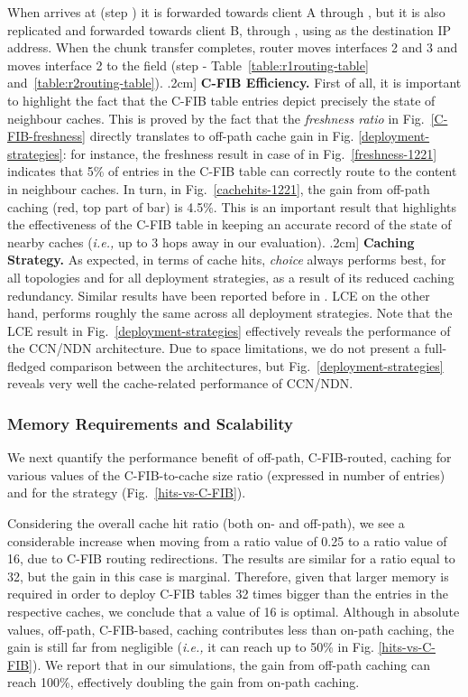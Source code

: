\documentclass{sig-alternate}
\newcommand{\ie}{{\em i.e.,\/ }}
\begin{document}
 
When  arrives at  (step ) it is forwarded towards client A through , but it is also replicated and forwarded towards client B, through , using  as the destination IP address. When the chunk  transfer completes, router  moves interfaces 2 and 3 and  moves interface 2 to the  field (step  - Table~\ref{table:r1routing-table} and~\ref{table:r2routing-table}).
\0.2cm]
\textbf{C-FIB Efficiency.} First of all, it is important to highlight the fact that the C-FIB table entries depict precisely the state of neighbour caches. This is proved by the fact that the \textit{freshness ratio} in Fig.~\ref{C-FIB-freshness} directly translates to off-path cache gain in Fig. \ref{deployment-strategies}: for instance, the freshness result in case of  in Fig.~\ref{freshness-1221} indicates that 5\% of entries in the C-FIB table can correctly route to the content in neighbour caches. In turn, in Fig.~\ref{cachehits-1221}, the gain from off-path caching (red, top part of bar) is 4.5\%. This is an important result that highlights the effectiveness of the C-FIB table in keeping an accurate record of the state of nearby caches (\ie up to 3 hops away in our evaluation).
\0.2cm]
\textbf{Caching Strategy.}
As expected, in terms of cache hits, \textit{choice} always performs best, for all topologies and for all deployment strategies, as a result of its reduced caching redundancy. Similar results have been reported before in \cite{probcache-tpds}. LCE on the other hand, performs roughly the same across all deployment strategies. Note that the LCE result in Fig.~\ref{deployment-strategies} effectively reveals the performance of the CCN/NDN architecture. Due to space limitations, we do not present a full-fledged comparison between the architectures, but Fig.~\ref{deployment-strategies} reveals very well the cache-related performance of CCN/NDN.





\subsubsection{Memory Requirements and Scalability}

We next quantify the performance benefit of off-path, C-FIB-routed, caching for various values of the C-FIB-to-cache size ratio (expressed in number of entries) and for the  strategy (Fig.~\ref{hits-vs-C-FIB}).

Considering the overall cache hit ratio (both on- and off-path), we see a considerable increase when moving from a ratio value of 0.25 to a ratio value of 16, due to C-FIB routing 
redirections. The results are similar for a ratio equal to 32, but the gain in this case is marginal. 
Therefore, given that larger memory is required in order to deploy C-FIB tables 32 times bigger than the entries in the respective caches, we conclude that a value of 16 is optimal.
Although in absolute values, off-path, 
C-FIB-based, caching contributes less than on-path caching, the gain is still far from negligible (\ie it can reach up to 50\% in Fig. \ref{hits-vs-C-FIB}).
We report that in our simulations, the gain from off-path caching can reach 100\%, effectively doubling the gain from on-path caching.
\end{document}
